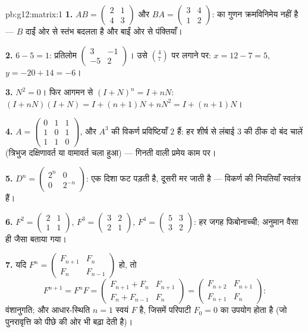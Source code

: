 \begin{solution}{pb:g12:matrix:1}
\textbf{1.} $AB = \begin{pmatrix} 2 & 1\\ 4 & 3\end{pmatrix}$ और $BA = \begin{pmatrix} 3 & 4\\ 1 & 2\end{pmatrix}$:  का गुणन क्रमविनिमेय नहीं है --- $B$ दाईं
ओर से स्तंभ बदलता है और बाईं ओर से पंक्तियाँ।

\textbf{2.}  $6 - 5 = 1$: प्रतिलोम $\begin{pmatrix} 3 & -1\\ -5 & 2\end{pmatrix}$। उसे $\binom{4}{7}$ पर लगाने पर: $x = 12 - 7 = 5$, $y = -20 + 14 = -6$।

\textbf{3.} $N^2 = 0$। फिर आगमन से $(I + N)^n = I + nN$: $(I + nN)(I + N) = I + (n+1)N + nN^2 = I + (n+1)N$।

\textbf{4.} $A = \begin{pmatrix} 0&1&1\\ 1&0&1\\ 1&1&0
\end{pmatrix}$, और $A^3$ की विकर्ण प्रविष्टियाँ $2$ हैं: हर शीर्ष से लंबाई
$3$ की ठीक दो बंद चालें (त्रिभुज दक्षिणावर्त या वामावर्त चला हुआ) --- गिनती
वाली प्रमेय काम पर।

\textbf{5.} $D^n = \begin{pmatrix} 2^n & 0\\ 0 & 2^{-n}
\end{pmatrix}$: एक दिशा फट पड़ती है, दूसरी मर जाती है --- विकर्ण की नियतियाँ
स्वतंत्र  हैं।

\textbf{6.} $F^2 = \begin{pmatrix} 2 & 1\\ 1 & 1\end{pmatrix}$, $F^3 = \begin{pmatrix} 3 & 2\\ 2 & 1\end{pmatrix}$, $F^4 = \begin{pmatrix} 5 & 3\\ 3 & 2\end{pmatrix}$: हर जगह फिबोनाच्ची; अनुमान वैसा ही जैसा बताया
गया।

\textbf{7.} यदि $F^n = \begin{pmatrix} F_{n+1} & F_n\\ F_n &
F_{n-1}\end{pmatrix}$ हो, तो
\[
F^{n+1} = F^n F =
\begin{pmatrix} F_{n+1} + F_n & F_{n+1}\\
F_n + F_{n-1} & F_n \end{pmatrix}
= \begin{pmatrix} F_{n+2} & F_{n+1}\\ F_{n+1} & F_n
\end{pmatrix} :
\]
वंशानुगति; और आधार-स्थिति $n = 1$ स्वयं $F$ है, जिसमें परिपाटी $F_0 = 0$ का उपयोग
होता है (जो पुनरावृत्ति को पीछे की ओर भी बढ़ा देती है)।


\end{solution}
